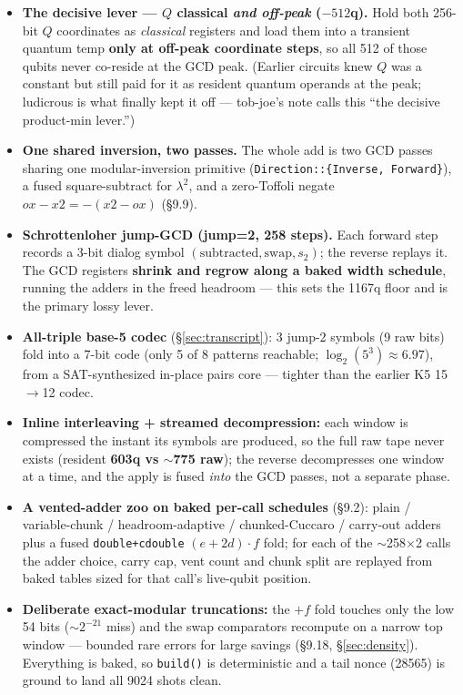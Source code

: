 \documentclass[11pt,a4paper]{article}
\begin{document}
\begin{itemize}
  \item \textbf{The decisive lever --- $Q$ classical \emph{and off-peak} ($-512$q).} Hold both 256-bit
    $Q$ coordinates as \emph{classical} registers and load them into a transient quantum temp
    \textbf{only at off-peak coordinate steps}, so all 512 of those qubits never co-reside at the GCD
    peak. (Earlier circuits knew $Q$ was a constant but still paid for it as resident quantum operands
    at the peak; ludicrous is what finally kept it off --- tob-joe's note calls this ``the decisive
    product-min lever.'')
  \item \textbf{One shared inversion, two passes.} The whole add is two GCD passes sharing one
    modular-inversion primitive (\texttt{Direction::\{Inverse, Forward\}}), a fused square-subtract for
    $\lambda^2$, and a zero-Toffoli negate $ox - x2 = -(x2 - ox)$ (\S9.9).
  \item \textbf{Schrottenloher jump-GCD (jump=2, 258 steps).} Each forward step records a 3-bit dialog
    symbol $(\text{subtracted}, \text{swap}, s_2)$; the reverse replays it. The GCD registers
    \textbf{shrink and regrow along a baked width schedule}, running the adders in the freed headroom
    --- this sets the 1167q floor and is the primary lossy lever.
  \item \textbf{All-triple base-5 codec} (\S\ref{sec:transcript}): 3 jump-2 symbols (9 raw bits) fold
    into a 7-bit code (only 5 of 8 patterns reachable; $\log_2(5^3)\approx 6.97$), from a
    SAT-synthesized in-place pairs core --- tighter than the earlier K5 15$\to$12 codec.
  \item \textbf{Inline interleaving + streamed decompression:} each window is compressed the instant
    its symbols are produced, so the full raw tape never exists (resident \textbf{603q vs $\sim$775
    raw}); the reverse decompresses one window at a time, and the apply is fused \emph{into} the GCD
    passes, not a separate phase.
  \item \textbf{A vented-adder zoo on baked per-call schedules} (\S9.2): plain /
    variable-chunk / headroom-adaptive / chunked-Cuccaro / carry-out adders plus a fused
    \texttt{double+cdouble} $(e+2d)\cdot f$ fold; for each of the $\sim$258$\times$2 calls the adder
    choice, carry cap, vent count and chunk split are replayed from baked tables sized for that call's
    live-qubit position.
  \item \textbf{Deliberate exact-modular truncations:} the $+f$ fold touches only the low 54 bits
    ($\sim$$2^{-21}$ miss) and the swap comparators recompute on a narrow top window --- bounded rare
    errors for large savings (\S9.18, \S\ref{sec:density}). Everything is baked, so \texttt{build()} is
    deterministic and a tail nonce (28565) is ground to land all 9024 shots clean.
\end{itemize}
\end{document}
